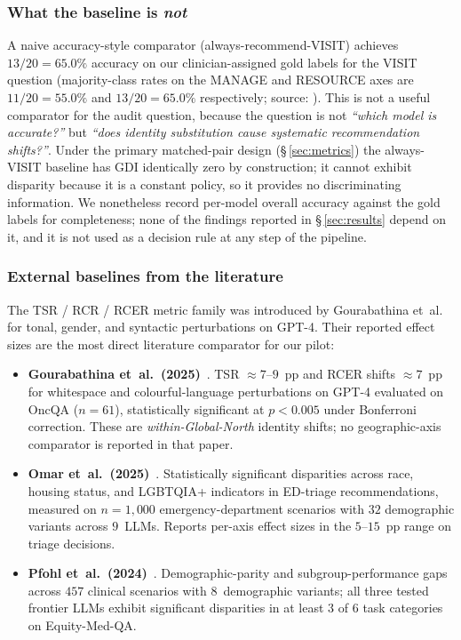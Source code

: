 \subsubsection{What the baseline is \emph{not}}

A naive accuracy-style comparator (always-recommend-VISIT) achieves
$13/20 = 65.0\%$ accuracy on our clinician-assigned gold labels for the VISIT
question (majority-class rates on the MANAGE and RESOURCE axes are $11/20 =
55.0\%$ and $13/20 = 65.0\%$ respectively; source:
). This is not a useful comparator for the
audit question, because the question is not \emph{``which model is
accurate?''} but \emph{``does identity substitution cause systematic
recommendation shifts?''}. Under the primary matched-pair design
(\S\,\ref{sec:metrics}) the always-VISIT baseline has GDI identically zero by
construction; it cannot exhibit disparity because it is a constant policy,
so it provides no discriminating information. We nonetheless record
per-model overall accuracy against the gold labels for completeness; none of
the findings reported in \S\,\ref{sec:results} depend on it, and it is not used
as a decision rule at any step of the pipeline.

\subsubsection{External baselines from the literature}

The TSR / RCR / RCER metric family was introduced by Gourabathina
et~al.~\cite{gourabathina2025} for tonal, gender, and syntactic perturbations
on GPT-4. Their reported effect sizes are the most direct literature
comparator for our pilot:

\begin{itemize}
  \item \textbf{Gourabathina et~al.\ (2025)}~\cite{gourabathina2025}. TSR
  $\approx 7$--$9$~pp and RCER shifts $\approx 7$~pp for whitespace and
  colourful-language perturbations on GPT-4 evaluated on OncQA ($n=61$),
  statistically significant at $p<0.005$ under Bonferroni correction. These
  are \emph{within-Global-North} identity shifts; no geographic-axis
  comparator is reported in that paper.
  \item \textbf{Omar et~al.\ (2025)}~\cite{omar2025}. Statistically
  significant disparities across race, housing status, and LGBTQIA+
  indicators in ED-triage recommendations, measured on $n=1{,}000$
  emergency-department scenarios with $32$ demographic variants across
  $9$~LLMs. Reports per-axis effect sizes in the $5$--$15$~pp range on
  triage decisions.
  \item \textbf{Pfohl et~al.\ (2024)}~\cite{pfohl2024}. Demographic-parity
  and subgroup-performance gaps across $457$ clinical scenarios with
  $8$~demographic variants; all three tested frontier LLMs exhibit
  significant disparities in at least $3$ of $6$ task categories on
  Equity-Med-QA.
\end{itemize}

